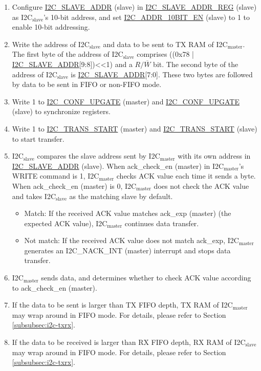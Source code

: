 \documentclass[main\_\_EN.tex]{subfiles}
\begin{document}
\begin{enumerate}
\item Configure \hyperref[fielddesc:I2CSLAVEADDR]{I2C\_SLAVE\_ADDR} (slave) in \hyperref[regdesc:I2CSLAVEADDRREG]{I2C\_SLAVE\_ADDR\_REG} (slave) as I2C$_\text{slave}$'s 10-bit address, and set \hyperref[fielddesc:I2CADDR10BITEN]{I2C\_ADDR\_10BIT\_EN} (slave) to 1 to enable 10-bit addressing.
\item Write the address of I2C$_\text{slave}$ and data to be sent to TX RAM of I2C$_\text{master}$. The first byte of the address of I2C$_\text{slave}$ comprises ((0x78 | \hyperref[fielddesc:I2CSLAVEADDR]{I2C\_SLAVE\_ADDR}[9:8])<<1) and a $R/\overline W$ bit. The second byte of the address of I2C$_\text{slave}$ is \hyperref[fielddesc:I2CSLAVEADDR]{I2C\_SLAVE\_ADDR}[7:0]. These two bytes are followed by data to be sent in FIFO or non-FIFO mode.
\item Write 1 to \hyperref[fielddesc:I2CCONFUPGATE]{I2C\_CONF\_UPGATE} (master) and \hyperref[fielddesc:I2CCONFUPGATE]{I2C\_CONF\_UPGATE} (slave) to synchronize registers.
\item Write 1 to \hyperref[fielddesc:I2CTRANSSTART]{I2C\_TRANS\_START} (master) and \hyperref[fielddesc:I2CTRANSSTART]{I2C\_TRANS\_START} (slave) to start transfer.
\item I2C$_\text{slave}$ compares the slave address sent by I2C$_\text{master}$ with its own address in \hyperref[fielddesc:I2CSLAVEADDR]{I2C\_SLAVE\_ADDR} (slave). When ack\_check\_en (master) in I2C$_\text{master}$'s WRITE command is 1, I2C$_\text{master}$ checks ACK value each time it sends a byte. When ack\_check\_en (master) is 0, I2C$_\text{master}$ does not check the ACK value and takes I2C$_\text{slave}$ as the matching slave by default.
\begin{itemize}
\item Match: If the received ACK value matches ack\_exp (master) (the expected ACK value), I2C$_\text{master}$ continues data transfer.
\item Not match: If the received ACK value does not match ack\_exp, I2C$_\text{master}$ generates an I2C\_NACK\_INT (master) interrupt and stops data transfer.
\end{itemize}


\item I2C$_\text{master}$ sends data, and determines whether to check ACK value according to ack\_check\_en (master).

\item If the data to be sent is larger than TX FIFO depth, TX RAM of I2C$_\text{master}$ may wrap around in FIFO mode. For details, please refer to Section \ref{subsubsec:i2c-txrx}. 
\item If the data to be received is larger than RX FIFO depth, RX RAM of I2C$_\text{slave}$ may wrap around in FIFO mode. For details, please refer to Section \ref{subsubsec:i2c-txrx}. 


\end{enumerate}
\end{document}
